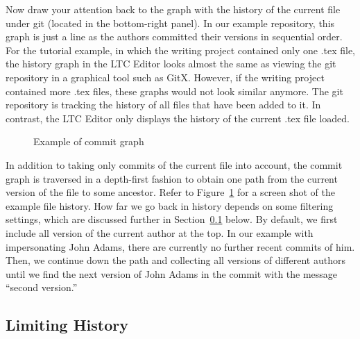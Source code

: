Now draw your attention back to the graph with the history of the current file under git (located in the bottom-right panel).  In our example repository, this graph is just a line as the authors committed their versions in sequential order.  For the tutorial example, in which the writing project contained only one .tex file, the history graph in the LTC Editor looks almost the same as viewing the git repository in a graphical tool such as GitX.  However, if the writing project contained more .tex files, these graphs would not look similar anymore.  The git repository is tracking the history of all files that have been added to it.  In contrast, the LTC Editor only displays the history of the current .tex file loaded.

\begin{figure}[t]
\centering
{}
\caption{Example of commit graph} \label{fig:commit-graph}
\end{figure}
In addition to taking only commits of the current file into account, the commit graph is traversed in a depth-first fashion to obtain one path from the current version of the file to some ancestor.  Refer to Figure~\ref{fig:commit-graph} for a screen shot of the example file history. How far we go back in history depends on some filtering settings, which are discussed further in Section~\ref{sec:limit-history} below.  By default, we first include all version of the current author at the top.  In our example with impersonating John Adams, there are currently no further recent commits of him.  Then, we continue down the path and collecting all versions of different authors until we find the next version of John Adams in the commit with the message ``second version.''


\subsection{Limiting History} \label{sec:limit-history}

